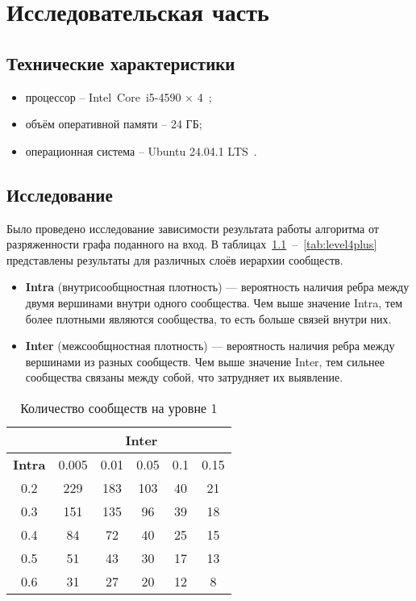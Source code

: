 \chapter{Исследовательская часть}

\section{Технические характеристики}

\begin{itemize}
	\item процессор -- Intel\textregistered~Core\texttrademark~i5-4590 × 4~\cite{cpu};
	\item объём оперативной памяти -- 24 ГБ;
	\item операционная система -- Ubuntu 24.04.1 LTS~\cite{ubuntu}.	
\end{itemize}

\section{Исследование}

Было проведено исследование зависимости результата работы алгоритма от разряженности графа поданного на вход. В таблицах~\ref{tab:level1}~--~\ref{tab:level4plus} представлены результаты для различных слоёв иерархии сообществ.

\begin{itemize}
\item \textbf{Intra} (внутрисообщностная плотность) --- вероятность наличия ребра между двумя вершинами внутри одного сообщества. Чем выше значение Intra, тем более плотными являются сообщества, то есть больше связей внутри них.
\item \textbf{Inter} (межсообщностная плотность) --- вероятность наличия ребра между вершинами из разных сообществ. Чем выше значение Inter, тем сильнее сообщества связаны между собой, что затрудняет их выявление.
\end{itemize}

\begin{table}[ht]
\centering
\caption{Количество сообществ на уровне 1}
\label{tab:level1}
\begin{tabular}{|c|c|c|c|c|c|}
\hline
\textbf{} & \multicolumn{5}{c|}{\textbf{Inter}} \\
\hline
\textbf{Intra} & 0.005 & 0.01 & 0.05 & 0.1 & 0.15 \\
\hline
0.2 & 229 & 183 & 103 & 40 & 21 \\
0.3 & 151 & 135 & 96  & 39 & 18 \\
0.4 & 84  & 72  & 40  & 25 & 15 \\
0.5 & 51  & 43  & 30  & 17 & 13 \\
0.6 & 31  & 27  & 20  & 12 & 8  \\
\hline
\end{tabular}
\end{table}

